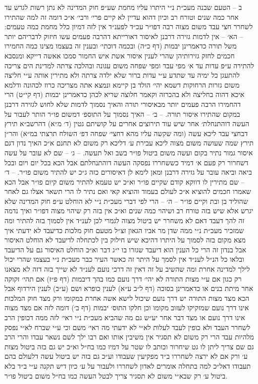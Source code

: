 \documentclass[12pt, openany]{book}
\begin{document}
\begin{multicols}{2}
ב – הטעם שבנה מעכ״ת נ״י היתרו עליו מחמת שע״פ חוק המדינה לא נתן רשות לגרש עד אחר כמה שנים וטורח רב וכיון דהוא עדיין לא קיים פרי׳ ורבי׳ א״כ דומה זה למה שהתירו לשחרר חצי עבד משום מצוה רבה דפו״ר עכ״ד לפענ״ד אין לזה דמיון כלל מחמת כמה טעמים: – הא׳ – אין לדמות גזירה דרבנן לאיסור דאורייתא דהרבה פעמים עשו חיזוק לדבריהם יותר משל תורה כדאמרינן יבמות (דף כ״ה) ובכמה דוכתי׳ ובענין זה בעצמו מצינו כמה החמירו חכמים לחזק גזירותיהן שהרי לענין איסור אשת איש החמור סמכו אאשה דייקא ומנסבא להתירה ע״פ עדות עד א׳ מפי עבד ומפי שפחה משום עגונה ובהלכה צרתה למדינת הים צריכה להתעגן כל ימיה עד שתדע ע״י עדות ברור שלא ילדה צרתה ולא מתירין אותה ע״י חליצה משום גזרות הרחוקות דשמא יהי׳ הולד בן קיימא ונמצא אתה מצריכה כרוז לכהונה ודלמא איכא דהוה בחליצה ולא בהכרזה וקאמר חלוצה שריא לכהן כדאמרינן יבמות (דף קי״ט) הרי דהחמירו הרבה פעמים יותר מבאיסורי תורה והאיך נסמוך לדמות שלא לחוש לגזירה דרבנן במקום שהתירו איסור תורה. – ב׳ – האיך נסמוך על התוספ׳ דמשום פו״ר הותר לעבור על העשה דוהתנחלת׳ אחר שיש עוד תירוצים אחרים על קושיתם גטין (ד׳ מ״א) דהרשב״א תירץ דבחצי עבד ליכא עשה (ומה שקשה עליו מהא דחצי׳ שפחה דפ׳ השולח תרצתי במ״א) והר״ן תירץ שמה שעושה משום מצוה ליכא עבירת ע׳ דליכא רק משום לא תחנם א״כ האיך נדון דגם איסור גמור נתיר בקום ועשה משום ביטול פו״ר בשב ואל תעשה. – ג׳ – שם לא עובר על עשה דשחרור רק פעם א׳ דמיד כששחררו נפסקה העשה דוהתנחלתם אבל הכא בכל יום ויום ובכל ביאה וביאה עובר על גזירה דרבנן ומאן לימא לן דאיסורים כזה ג״כ יש להתיר משום פו״ר. – ד׳ – שם מתירין לו דווקא קודם שקיים פו״ר וא״כ יש טעמא להתיר משום קיום פו״ר אבל הכא שאמרו חכמים להוציא א״כ לעולם בעמוד והוציא קאי ואם נתיר לו הרי תשאר אצלו גם לאחר שהוליד בן ובת וקיים פו״ר – ה׳ – הרי לפי דברי מעכ״ת נ״י לא הוחלט ע״פ חוק המדינה שלא יגרש אלא שיש בזה טורח רב ושיהוי כמה שנים וא״כ אין בזה רק שיהוי מצוה דפו״ר ואיך נדמה זה להך דעבד דאם לא משחרר יש ביטול מצוה לגמרי לכן לענ״ד אין לסמוך בזה להתיר ומה שמזכיר מעכ״ת נ״י ממה שדן מר אביו הגאון זצ״ל מטעם חוק מלכות כדיעבד לא ידעתי איך מצא מקום בזה לסמוך על היתרו דהיכא שיש חילוק בין לכתחלה לדיעבד לא הוחלט האיסור אבל בנדון זה הרי כל הענין הוא דיעבד שגזרו בו י״ג דבר וא״כ הוחלט האיסור גם על הדיעבד ובלאו כל הנ״ל לענ״ד אין לסמך על היתר זה כאשר העיר כבר מעכ״ת נ״י בעצמו שהרי יכול לילך למדינה אחרת ומה שהשיב על זה דאין זה דרכי נועם לענ״ד לא שייך בזה דזה לא מצאנו רק כגון אם ע״י מצות התורה לא יהי׳ דרך נועם כמו בהך דיבמות (דף פ״ז) אם תהי׳ זקוקה אחר מיתת בנים או כדאמרינן בסוכה (דף ל״ב ע״א) לענין כופרא ושם (ע״ב) לענין הירדוף אבל הכא מצד מצות התורה יש דרך נועם שיכול לישא אשה אחרת במקומו ורק מצד חוק המלכות אינו דרך נועם שמזקיקו לעזוב מקומו וכן חלקו התוס׳ יבמות (דף ב׳) דומה לזה אם מצד מצוה אינו דרך נועם או מצד דבר אחר יע״ש גם מה שהביא מעכ״ת נ״י ראי׳ לזה ממה דכופין הרב לשחרר העבד ולא כופין לעבד לעלות לא״י לא ידעתי מה ראי׳ משם וכי ע״י שברח לא״י נפסק מלהיות עבד הרי רק משום לא תסגיר אין משיבין אותו ואם רבו ילך לשם נשאר עבדו והרי הרב גם שם צריך ליתן לו גט שיחרור וכותב לו שטר על דמיו כמו בח״ל וא״כ יש גם בזה ביטול מצות ע׳ ורק אם לא ירצה לשחררו ב״ד מפקיעין שעבודו וע״כ גם בזה יש ביטול עשה דלעולם בהם תעבודו דאל״כ למה בתחלה אומרים לאדון לשחררו ולעבור על ע׳ כיון דיש תקנה ע״י ב״ד בלא ביטול ע׳ רק שבא״י משום לא תסגיר צריך לבטל העשה כמו בח״ל משום ביטול פו״ר.\\\vspace{0pt}


\end{multicols}
\end{document}
